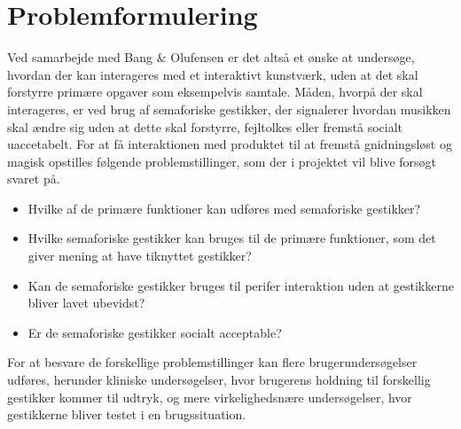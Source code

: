 \section{Problemformulering}
\label{Problemformulering}

Ved samarbejde med Bang $\&$ Olufensen er det altså et ønske at undersøge, hvordan der kan interageres med et interaktivt kunstværk, uden at det skal forstyrre primære opgaver som eksempelvis samtale. Måden, hvorpå der skal interageres, er ved brug af semaforiske gestikker, der signalerer hvordan musikken skal ændre sig uden at dette skal forstyrre, fejltolkes eller fremstå socialt uaccetabelt. For at få interaktionen med produktet til at fremstå gnidningsløst og magisk opstilles følgende problemstillinger, som der i projektet vil blive forsøgt svaret på.

\begin{itemize}
	\item Hvilke af de primære funktioner kan udføres med semaforiske gestikker?
	\item Hvilke semaforiske gestikker kan bruges til de primære funktioner, som det giver mening at have tiknyttet gestikker?
	\item Kan de semaforiske gestikker bruges til perifer interaktion uden at gestikkerne bliver lavet ubevidst?
	\item Er de semaforiske gestikker socialt acceptable?
\end{itemize}

For at besvare de forskellige problemstillinger kan flere brugerundersøgelser udføres, herunder kliniske undersøgelser, hvor brugerens holdning til forskellig gestikker kommer til udtryk, og mere virkelighedsnære undersøgelser, hvor gestikkerne bliver testet i en brugssituation.